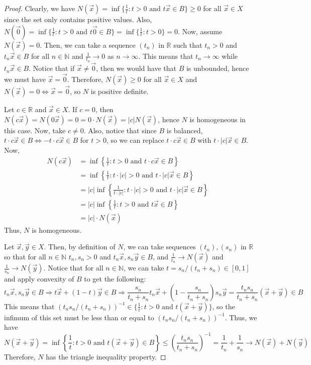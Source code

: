 \documentclass{article}
\newcommand{\longimplies}{\Longrightarrow}
\newcommand{\N}{\mathbb{N}}
\newcommand{\R}{\mathbb{R}}
\theoremstyle{plain} %
\numberwithin{thm}{section} %
\theoremstyle{definition} %
\begin{document}
\begin{proof}
 Clearly, we have $N(\vec{x}) = \inf\{\frac{1}{t}: t > 0 \text{ and } t\vec{x} \in B\} \geq 0$ for all $\vec{x} \in X$ since the set only contains positive values. Also, $N(\vec{0}) = \inf\{\frac{1}{t}: t > 0 \text{ and } t\vec{0} \in B\} = \inf\{\frac{1}{t}: t > 0\} = 0$. Now, assume $N(\vec{x}) = 0$. Then, we can take a sequence $(t_n)$ in $\R$ such that $t_n > 0$ and $t_n\vec{x} \in B$ for all $n \in \N$ and $\frac{1}{t_n} \to 0$ as $n \to \infty$. This means that $t_n \to \infty$ while $t_n\vec{x} \in B$. Notice that if $\vec{x} \neq \vec{0}$, then we would have that $B$ is unbounded, hence we must have $\vec{x} = \vec{0}$. Therefore, $N(\vec{x}) \geq 0$ for all $\vec{x} \in X$ and $N(\vec{x}) = 0 \iff \vec{x} = \vec{0}$, so $N$ is positive definite.

 Let $c \in \R$ and $\vec{x} \in X$. If $c = 0$, then $N(c\vec{x}) = N(0\vec{x}) = 0 = 0 \cdot N(\vec{x}) = |c| N(\vec{x})$, hence $N$ is homogeneous in this case. Now, take $c \neq 0$. Also, notice that since $B$ is balanced, $t \cdot c\vec{x} \in B \iff -t \cdot c\vec{x} \in B$ for $t > 0$, so we can replace $t \cdot c\vec{x} \in B$ with $t \cdot |c|\vec{x} \in B$. Now,
\begin{align*}
N(c\vec{x}) &= \inf\left\{\frac{1}{t}: t > 0 \text{ and } t \cdot c\vec{x} \in B\right\} &\\
&= \inf\left\{\frac{1}{t}: t \cdot |c| > 0 \text{ and } t \cdot |c|\vec{x} \in B\right\} &\\
&= |c|\inf\left\{\frac{1}{t \cdot |c|}: t \cdot |c| > 0 \text{ and } t \cdot |c|\vec{x} \in B\right\} &\\
&= |c|\inf\left\{\frac{1}{t}: t > 0 \text{ and } t\vec{x} \in B\right\} &\\
&= |c| \cdot N(\vec{x})
\end{align*}
Thus, $N$ is homogeneous.

 Let $\vec{x}, \vec{y} \in X$. Then, by definition of $N$, we can take sequences $(t_n), (s_n)$ in $\R$ so that for all $n \in \N$ $t_n, s_n > 0$ and $t_n\vec{x}, s_n\vec{y} \in B$, and $\frac{1}{t_n} \to N(\vec{x})$ and $\frac{1}{s_n} \to N(\vec{y})$. Notice that for all $n \in \N$, we can take $t = s_n / (t_n + s_n) \in [0, 1]$ and apply convexity of $B$ to get the following: 
\[
t_n\vec{x}, s_n\vec{y} \in B \longimplies t\vec{x} + (1-t)\vec{y} \in B \longimplies \frac{s_n}{t_n + s_n}t_n\vec{x} + \left(1 - \frac{s_n}{t_n + s_n}\right)s_n\vec{y} = \frac{t_ns_n}{t_n + s_n}(\vec{x} + \vec{y}) \in B
\]
This means that $(t_ns_n / (t_n + s_n))^{-1} \in \{\frac{1}{t}: t > 0 \text{ and } t(\vec{x} + \vec{y})\}$, so the infimum of this set must be less than or equal to $(t_ns_n / (t_n + s_n))^{-1}$. Thus, we have
\[
    N(\vec{x} + \vec{y}) = \inf\left\{\frac{1}{t}: t > 0 \text{ and } t(\vec{x} + \vec{y}) \in B\right\} \leq \left(\frac{t_ns_n}{t_n + s_n}\right)^{-1} = \frac{1}{t_n} + \frac{1}{s_n} \to N(\vec{x}) + N(\vec{y})
\]
Therefore, $N$ has the triangle inequality property.


\end{proof}
\end{document}
